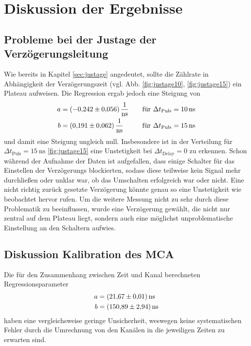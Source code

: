 \section{Diskussion der Ergebnisse}
\label{sec:Diskussion}

\subsection{Probleme bei der Justage der Verzögerungsleitung}
Wie bereits in Kapitel \ref{sec:justage} angedeutet, sollte die Zählrate in Abhängigkeit der Verzögerungszeit (vgl. Abb. \ref{fig:justage10}, \ref{fig:justage15})
ein Plateau aufweisen. Die Regression ergab jedoch eine Steigung von 
\begin{align*}
    a&=\SI{-0.242 \pm 0.056}{\per\nano\second} \quad &\text{für $\Delta t_{\text{Puls}}=\SI{10}{\nano\second}$}\\
    b&=\SI{0.191 \pm 0.062 }{\per\nano\second} \quad &\text{für $\Delta t_{\text{Puls}}=\SI{15}{\nano\second}$}
\end{align*}
und damit eine Steigung ungleich null. Insbesondere ist in der Verteilung für $\Delta t_{\text{Puls}}=\SI{15}{\nano\second}$ \ref{fig:justage15} eine 
Unstetigkeit bei $\Delta t_\text{Delay}=0$ zu erkennen. Schon während der Aufnahme der Daten ist aufgefallen, dass einige Schalter für das Einstellen der Verzögerungs
blockierten, sodass diese teilweise kein Signal mehr durchließen oder unklar war, ob das Umschalten erfolgreich war oder nicht. Eine nicht richtig zurück
gesetzte Verzögerung könnte genau so eine Unstetigkeit wie beobachtet hervor rufen. Um die weitere Messung nicht zu sehr durch diese Problematik zu beeinflussen,
wurde eine Verzögerung gewählt, die nicht nur zentral auf dem Plateau liegt, sondern auch eine möglichst unproblematische Einstellung an den Schaltern aufwies.

\subsection{Diskussion Kalibration des MCA}
Die für den Zusammenhang zwischen Zeit und Kanal berechneten Regressionsparameter 
\begin{align*}
    a &= \SI{21.67 \pm 0.01}{\nano\second} \\ 
    b &= \SI{150.89 \pm 2.94}{\nano\second}
 \end{align*}
haben eine vergleichsweise geringe Unsicherheit, weswegen keine systematischen Fehler durch die Umrechnung von den Kanälen in die jeweiligen Zeiten zu erwarten sind. 

